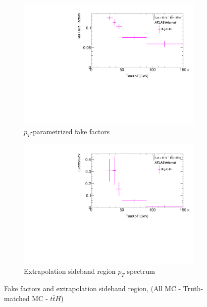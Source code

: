 \documentclass[11pt]{article}
\begin{document}
	\begin{figure}[H]
	\centering
	\begin{subfigure}{.5\textwidth}
	\centering
	\includegraphics[width=1.\linewidth]{figures/FakesEstimate_data_pp8_nonallhad_new_SubtractionFix_newOverlay/FF_Faketau_Bkg-truth.pdf}
  	\caption{$p_T$-parametrized fake factors}
  	\label{fig:sub1}
	\end{subfigure}%
	\begin{subfigure}{.5\textwidth}
	\centering
	\includegraphics[width=1.\linewidth]{figures/FakesEstimate_data_pp8_nonallhad_new_SubtractionFix_newOverlay/hist_Extrapolation_Bkg-truth.pdf}
	\caption{Extrapolation sideband region $p_T$ spectrum}
	\end{subfigure}
	\caption{Fake factors and extrapolation sideband region, (All MC - Truth-matched MC - $t\bar{t}H$)}
	\end{figure}
	
\end{document}

